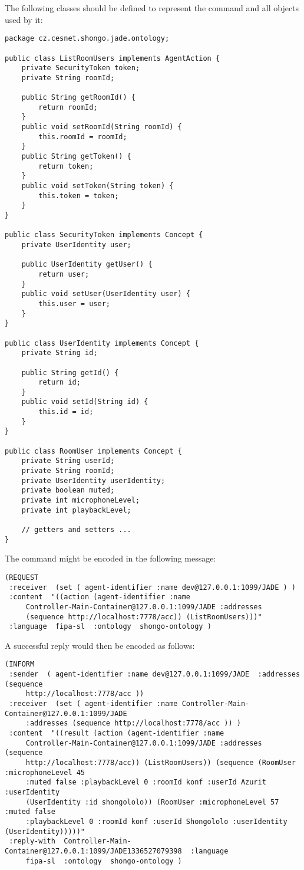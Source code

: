 The following classes should be defined to represent the command and all objects used by it:
\begin{verbatim}
package cz.cesnet.shongo.jade.ontology;

public class ListRoomUsers implements AgentAction {
    private SecurityToken token;
    private String roomId;

    public String getRoomId() {
        return roomId;
    }
    public void setRoomId(String roomId) {
        this.roomId = roomId;
    }
    public String getToken() {
        return token;
    }
    public void setToken(String token) {
        this.token = token;
    }
}

public class SecurityToken implements Concept {
    private UserIdentity user;

    public UserIdentity getUser() {
        return user;
    }
    public void setUser(UserIdentity user) {
        this.user = user;
    }
}

public class UserIdentity implements Concept {
    private String id;

    public String getId() {
        return id;
    }
    public void setId(String id) {
        this.id = id;
    }
}

public class RoomUser implements Concept {
    private String userId;
    private String roomId;
    private UserIdentity userIdentity;
    private boolean muted;
    private int microphoneLevel;
    private int playbackLevel;

    // getters and setters ...
}
\end{verbatim}

The command might be encoded in the following message:
\begin{verbatim}
(REQUEST
 :receiver  (set ( agent-identifier :name dev@127.0.0.1:1099/JADE ) )
 :content  "((action (agent-identifier :name
     Controller-Main-Container@127.0.0.1:1099/JADE :addresses
     (sequence http://localhost:7778/acc)) (ListRoomUsers)))"
 :language  fipa-sl  :ontology  shongo-ontology )
\end{verbatim}

A successful reply would then be encoded as follows:
\begin{verbatim}
(INFORM
 :sender  ( agent-identifier :name dev@127.0.0.1:1099/JADE  :addresses (sequence
     http://localhost:7778/acc ))
 :receiver  (set ( agent-identifier :name Controller-Main-Container@127.0.0.1:1099/JADE
     :addresses (sequence http://localhost:7778/acc )) )
 :content  "((result (action (agent-identifier :name
     Controller-Main-Container@127.0.0.1:1099/JADE :addresses (sequence
     http://localhost:7778/acc)) (ListRoomUsers)) (sequence (RoomUser :microphoneLevel 45
     :muted false :playbackLevel 0 :roomId konf :userId Azurit :userIdentity
     (UserIdentity :id shongololo)) (RoomUser :microphoneLevel 57 :muted false
     :playbackLevel 0 :roomId konf :userId Shongololo :userIdentity (UserIdentity)))))"
 :reply-with  Controller-Main-Container@127.0.0.1:1099/JADE1336527079398  :language
     fipa-sl  :ontology  shongo-ontology )
\end{verbatim}

